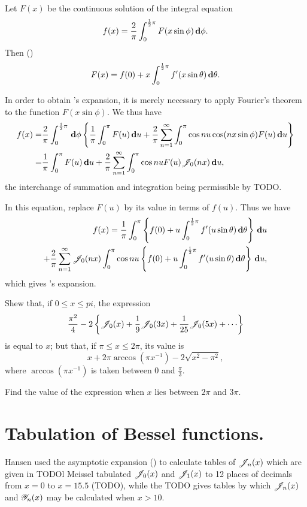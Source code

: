\documentclass{book}
\begin{document}
Let $F(x)$ be the continuous solution of the integral equation
$$
f(x) = \frac{2}{\pi} \int_{0}^{\frac{1}{2} \pi} F(x \sin\phi) \, \mathbf{d} \phi.
$$
Then ()
$$
F(x) = f(0) + x \int_{0}^{\frac{1}{2}\pi} f'(x\sin\theta) \, \mathbf{d}\theta.
$$

In order to obtain \Schlomilch's expansion, it is merely necessary to
apply Fourier's theorem to the function $F(x\sin\phi)$. We thus have
\begin{align*}
  f(x)
  =&
  \frac{2}{\pi}
  \int_{0}^{\frac{1}{2}\pi}
  \, \mathbf{d}\phi
  \left\{ 
    \frac{1}{\pi}
    \int_{0}^{\pi} F(u) \, \mathbf{d} u
    +
    \frac{2}{\pi}
    \sum_{n=1}^{\infty}
    \int_{0}^{\pi} \cos nu \cos(nx\sin\phi) F(u) \, \mathbf{d} u
   \right\}
  \\
  =&
  \frac{1}{\pi}
  \int_{0}^{\pi}
  F(u) \, \mathbf{d} u
  +
  \frac{2}{\pi}
  \sum_{n=1}^{\infty}
  \int_{0}^{\pi} \cos nu F(u) \mathscr{J}_0(nx) \, \mathbf{d} u,
\end{align*}
the interchange of summation and integration being permissible by
TODO.

In this equation, replace $F(u)$ by its value in terms of $f(u)$. Thus
we have
\begin{align*}
  f(x)
  =
  \frac{1}{\pi}
  \int_{0}^{\pi}
  \left\{ 
    f(0) + u \int_{0}^{\frac{1}{2}\pi} f'(u\sin\theta) \, \mathbf{d}\theta
   \right\}
  \, \mathbf{d} u
  \\
  +
  \frac{2}{\pi}
  \sum_{n=1}^{\infty}
  \mathscr{J}_{0}(nx)
  \int_{0}^{\pi}
  \cos nu
  \left\{ 
    f(0) + u \int_{0}^{\frac{1}{2}\pi} f'(u\sin\theta) \, \mathbf{d}\theta
   \right\}
  \, \mathbf{d} u,
\end{align*}
which gives \Schlomilch's expansion.
\begin{wandwexample}
  Shew that, if $0 \leq x \leq pi$, the expression
  $$
  \frac{\pi^{2}}{4}
  -
  2
  \thebrace{
    \besJ_{0}(x)
    + \frac{1}{9} \besJ_{0}(3x)
    + \frac{1}{25} \besJ_{0}(5x)
    + \cdots
  }
  $$
  is equal to $x$; but that, if $\pi \leq x \leq 2\pi$, its value is
  $$
  x
  +
  2\pi \arccos (\pi x^{-1})
  -
  2 \sqrt{x^2 - \pi^2},
  $$
  where $\arccos(\pi x^{-1})$ is taken between $0$ and
  $\frac{\pi}{3}$.

  Find the value of the expression when $x$ lies between $2\pi$ and
  $3\pi$.
\end{wandwexample}

\section{Tabulation of Bessel functions.}
Hansen used the asymptotic expansion () to
calculate tables of $\mathscr{J}_n(x)$ which are given in TODOl
Meissel tabulated $\mathscr{J}_0(x)$ and $\mathscr{J}_1(x)$ to 12 places of
decimals from $x=0$ to $x = 15.5$ (TODO), while the TODO gives tables
by which $\mathscr{J}_n(x)$ and $\mathscr{Y}_n(x)$ may be calculated when $x >
10$.
\end{document}
